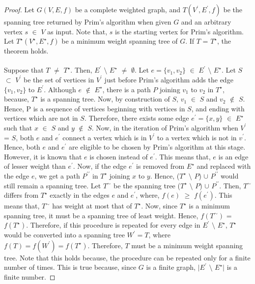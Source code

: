 \documentclass[12pt]{article}
\numberwithin{equation}{subsection}
\numberwithin{table}{subsection}
\begin{document}
\begin{proof}
Let $G(V,E,f)$ be a complete weighted graph, and $T(V^\prime,E^\prime,f)$ be the spanning tree returned by Prim's algorithm when given $G$ and an arbitrary vertex $s$ $\in$ $V$ as input. Note that, $s$ is the starting vertex for Prim's algorithm. Let $T^\star(V^\star,E^\star,f)$ be a minimum weight spanning tree of $G$. If $T$ = $T^\star$, the theorem holds.\\\\
Suppose that $T$ $\neq$ $T^\star$. Then,  $E^\prime$ $\setminus$ $E^\star$ $\neq$ $\emptyset$. Let $e = \{v_1, v_2\}$ $\in$  $E^\prime$ $\setminus$ $E^\star$. Let $S$ $\subset$ $V^\prime$ be the set of vertices in $V^\prime$ just before Prim's algorithm adds the edge $\{v_1, v_2\}$ to $E^\prime$. Although $e$ $\notin$ $E^\star$, there is a path $P$ joining $v_1$ to $v_2$ in $T^\star$, because, $T^\star$ is a spanning tree. Now, by construction of $S$, $v_1$ $\in$ $S$ and $v_2$ $\notin$ $S$. Hence, P is a sequence of vertices beginning with vertices in $S$, and ending with vertices which are not in $S$. Therefore, there exists some edge $e^\prime = \{x,y\}$ $\in$ $E^\star$ such that $x$ $\in$ $S$ and $y$ $\notin$ $S$. Now, in the iteration of Prim's algorithm when $V^\prime$ = $S$, both $e$ and $e^\prime$ connect a vertex which is in $V^\prime$ to a vertex which is not in $v^\prime$. Hence, both $e$ and $e^\prime$ are eligible to be chosen by Prim's algorithm at this stage. However, it is known that $e$ is chosen instead of $e^\prime$. This means that, $e$ is an edge of lesser weight than $e^\prime$. Now, if the edge $e^\prime$ is removed from $E^\star$ and replaced with the edge $e$, we get a path $P^{\prime\prime}$ in $T^\star$ joining $x$ to $y$. Hence, ($T^\star$ $\setminus$ $P$) $\cup$ $P^{\prime\prime}$ would still remain a spanning tree. Let $T^\sim$ be the spanning tree ($T^\star$ $\setminus$ $P$) $\cup$ $P^{\prime\prime}$. Then, $T^\sim$ differs from $T^\star$ exactly in the edges $e$ and $e^\prime$, where, $f(e)$ $\geq$ $f(e^\prime)$. This means that, $T^\sim$ has weight at most that of $T^\star$. Now, since $T^\star$ is a minimum spanning tree, it must be a spanning tree of least weight. Hence, $f(T^\sim)$ = $f(T^\star)$. Therefore, if this procedure is repeated for every edge in $E^\prime$ $\setminus$ $E^\star$, $T^\star$ would be converted into a spanning tree $W^\prime = T$, where $f(T) = f(W^\prime) = f(T^\star)$. Therefore, $T$ must be a minimum weight spanning tree. Note that this holds because, the procedure can be repeated only for a finite number of times. This is true because, since $G$ is a finite graph, $|E^\prime$ $\setminus$ $E^\star|$ is a finite number.
\end{proof}
\end{document}
